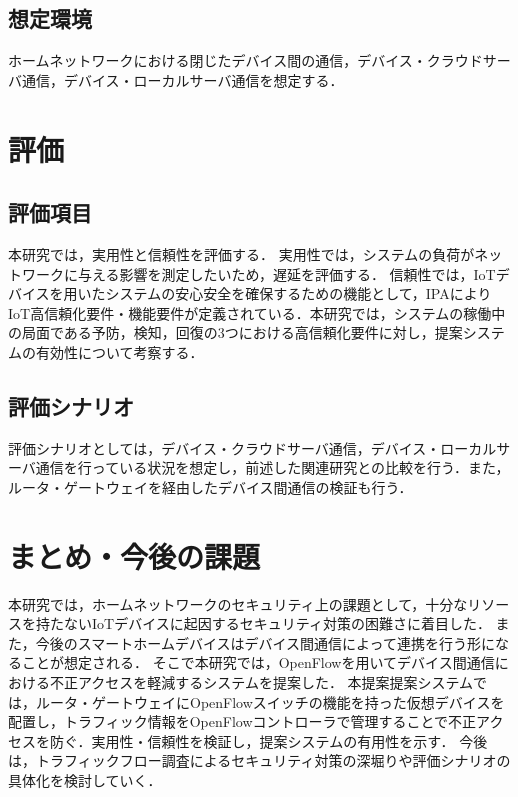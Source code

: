 \documentclass[a4paper,10pt,twocolumn,uplatex]{jsarticle}
\begin{document}
\subsection{想定環境}
ホームネットワークにおける閉じたデバイス間の通信，デバイス・クラウドサーバ通信，デバイス・ローカルサーバ通信を想定する．

\section{評価}
\subsection{評価項目}
本研究では，実用性と信頼性を評価する．
実用性では，システムの負荷がネットワークに与える影響を測定したいため，遅延を評価する．
信頼性では，IoTデバイスを用いたシステムの安心安全を確保するための機能として，IPAによりIoT高信頼化要件・機能要件が定義されている\cite{IPA}．本研究では，システムの稼働中の局面である予防，検知，回復の3つにおける高信頼化要件に対し，提案システムの有効性について考察する．


\subsection{評価シナリオ}
評価シナリオとしては，デバイス・クラウドサーバ通信，デバイス・ローカルサーバ通信を行っている状況を想定し，前述した関連研究との比較を行う．また，ルータ・ゲートウェイを経由したデバイス間通信の検証も行う．

\section{まとめ・今後の課題}
本研究では，ホームネットワークのセキュリティ上の課題として，十分なリソースを持たないIoTデバイスに起因するセキュリティ対策の困難さに着目した．
また，今後のスマートホームデバイスはデバイス間通信によって連携を行う形になることが想定される．
そこで本研究では，OpenFlowを用いてデバイス間通信における不正アクセスを軽減するシステムを提案した．
本提案提案システムでは，ルータ・ゲートウェイにOpenFlowスイッチの機能を持った仮想デバイスを配置し，トラフィック情報をOpenFlowコントローラで管理することで不正アクセスを防ぐ．実用性・信頼性を検証し，提案システムの有用性を示す．
今後は，トラフィックフロー調査によるセキュリティ対策の深堀りや評価シナリオの具体化を検討していく．
\end{document}
